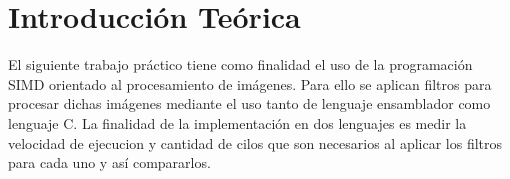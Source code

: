 \section{Introducci\'on Te\'orica}
El siguiente trabajo pr\'actico tiene como finalidad el uso de la programaci\'on SIMD orientado al procesamiento de im\'agenes. Para ello se aplican filtros para procesar dichas im\'agenes mediante el uso tanto de lenguaje ensamblador como lenguaje C.\newline
\indent La finalidad de la implementaci\'on en dos lenguajes es medir la velocidad de ejecucion y cantidad de cilos que son necesarios al aplicar los filtros para cada uno y as\'i compararlos.
